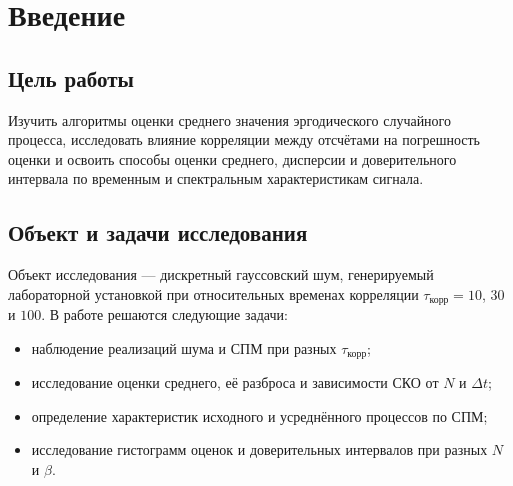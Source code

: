\section{Введение}
\subsection*{Цель работы} 

Изучить алгоритмы оценки среднего значения эргодического случайного процесса, исследовать влияние корреляции между отсчётами на погрешность оценки и освоить способы оценки среднего, дисперсии и доверительного интервала по временным и спектральным характеристикам сигнала.

\subsection*{Объект и задачи исследования} 

Объект исследования --- дискретный гауссовский шум, генерируемый лабораторной установкой при относительных временах корреляции $\tau_\text{корр} = 10$, $30$ и $100$. В работе решаются следующие задачи:

\begin{itemize}
	\item наблюдение реализаций шума и СПМ при разных $\tau_\text{корр}$;
	\item исследование оценки среднего, её разброса и зависимости СКО от $N$ и $\Delta t$;
	\item определение характеристик исходного и усреднённого процессов по СПМ;
	\item исследование гистограмм оценок и доверительных интервалов при разных $N$ и $\beta$.
\end{itemize}
